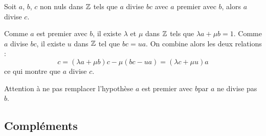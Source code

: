 \begin{propn}
\begin{thm}[de Gauss]
 Soit $a$, $b$, $c$ non nuls dans $\mathbb{Z}$ tels que $a$ divise $bc$ avec $a$ premier avec $b$, alors $a$ divise $c$.
\end{thm}
\begin{demo}
 Comme $a$ est premier avec $b$, il existe $\lambda$ et $\mu$ dans $\mathbb{Z}$ tels que $\lambda a + \mu b=1$. Comme $a$ divise $bc$, il existe $u$ dans $\mathbb{Z}$ tel que $bc=ua$. On combine alors les deux relations :
\begin{displaymath}
 c=(\lambda a +\mu b)c - \mu(bc-ua)=(\lambda c +\mu u)a
\end{displaymath}
ce qui montre que $a$ divise $c$.
\end{demo}
\begin{rem}
 Attention à ne pas remplacer l'hypothèse \og$a$ est premier avec $b$\fg par \og$a$ ne divise pas $b$\fg.
\end{rem}

\subsection{Compléments}

\end{propn}
